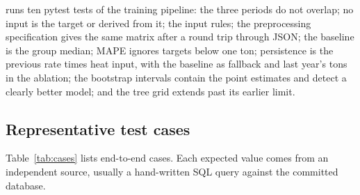 \documentclass[11pt,a4paper]{article}
\begin{document}
 runs ten pytest tests of the training pipeline: the three periods do not
overlap; no input is the target or derived from it; the input rules; the preprocessing
specification gives the same matrix after a round trip through JSON; the baseline is the group
median; MAPE ignores targets below one ton; persistence is the previous rate times heat input,
with the baseline as fallback and last year's tons in the ablation; the bootstrap intervals
contain the point estimates and detect a clearly better model; and the tree grid extends past
its earlier limit.

\subsection{Representative test cases}

Table~\ref{tab:cases} lists end-to-end cases. Each expected value comes from an independent
source, usually a hand-written SQL query against the committed database.
\end{document}
